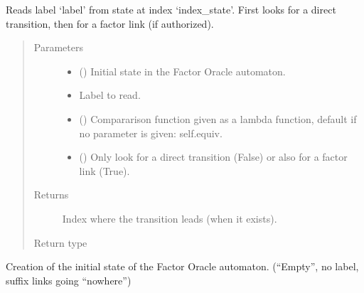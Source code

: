 \documentclass[letterpaper,10pt,english]{sphinxmanual}
\begin{document}
\begin{fulllineitems}
\begin{fulllineitems}
\label{\detokenize{index:Model.FactorOracle.from_state_read_label}}
Reads label ‘label’ from state at index ‘index\_state’.
First looks for a direct transition, then for a factor link (if authorized).
\begin{quote}\begin{description}
\item[{Parameters}] \leavevmode\begin{itemize}
\item {} 
 () \textendash{} Initial state in the Factor Oracle automaton.

\item {} 
 \textendash{} Label to read.

\item {} 
 () \textendash{} Compararison function given as a lambda function, default if no parameter is given: self.equiv.

\item {} 
 () \textendash{} Only look for a direct transition (False) or also for a factor link (True).

\end{itemize}

\item[{Returns}] \leavevmode
Index where the transition leads (when it exists).

\item[{Return type}] \leavevmode
{}

\end{description}\end{quote}

\end{fulllineitems}


\begin{fulllineitems}
\label{\detokenize{index:Model.FactorOracle.init_model}}
Creation of the initial state of the Factor Oracle automaton. (“Empty”, no label, suffix links going “nowhere”)


\end{fulllineitems}
\end{fulllineitems}
\end{document}
